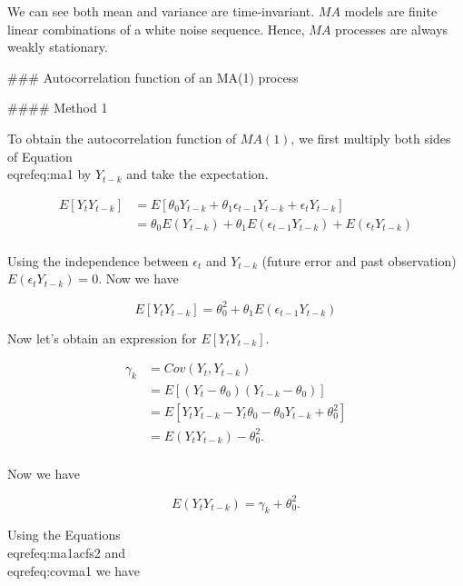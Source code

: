 \documentclass[11pt,a4paper,]{article}
\begin{document}
{We can see both mean and variance are time-invariant.  $MA$ models are finite linear combinations of a white noise sequence. Hence, $MA$ processes are always weakly stationary. 

### Autocorrelation function of an MA(1) process

#### Method 1

To obtain the autocorrelation function of $MA(1)$, we first multiply both sides of Equation \\eqref{eq:ma1} by $Y_{t-k}$ and take the expectation. 

\begin{equation}
\label{eq: ma1acfs1}
\begin{aligned}
E[Y_tY_{t-k}] &= E[\theta_0 Y_{t-k} + \theta_1 \epsilon_{t-1} Y_{t-k} + \epsilon_t Y_{t-k}]\\
&= \theta_0 E(Y_{t-k}) + \theta_1 E(\epsilon_{t-1}Y_{t-k}) + E(\epsilon_t Y_{t-k})\\
\end{aligned}
\end{equation}

Using the independence between $\epsilon_t$ and $Y_{t-k}$ (future error and past observation) $E(\epsilon_t Y_{t-k}) = 0$. Now we have

\begin{equation}
\label{eq:ma1acfs2}
E[Y_tY_{t-k}] = \theta_0^2  + \theta_1 E(\epsilon_{t-1}Y_{t-k}) 
\end{equation}

Now let's obtain an expression for $E[Y_t Y_{t-k}]$. 


\begin{equation}
  \label{eq:covma1}
\begin{aligned}
  \gamma_k &= Cov(Y_t, Y_{t-k}) \\
         &= E[(Y_t-\theta_0)(Y_{t-k}-\theta_0)] \\
         &= E[Y_tY_{t-k}-Y_t\theta_0-\theta_0 Y_{t-k} +\theta_0^2] \\
         &= E(Y_t Y_{t-k}) - \theta_0^2. \\
\end{aligned}
\end{equation}

Now we have 

\begin{equation}
  \label{eq:covma1}
  E(Y_t Y_{t-k}) = \gamma_k + \theta_0^2.
\end{equation}

Using the Equations \\eqref{eq:ma1acfs2} and \\eqref{eq:covma1} we have

}
\end{document}
